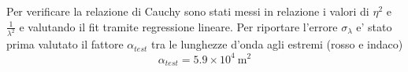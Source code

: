 Per verificare la relazione di Cauchy sono stati messi in relazione i valori di $\eta^2$ e $\frac{1}{\lambda^2}$
e valutando il fit tramite regressione lineare.
Per riportare l'errore $\sigma_{\lambda}$ e' stato prima valutato il fattore $\alpha_{test}$ tra le lunghezze d'onda agli estremi (rosso e indaco)
\[
    \alpha_{test} = 5.9 \times 10^4 \ \text{m}^2
\]

